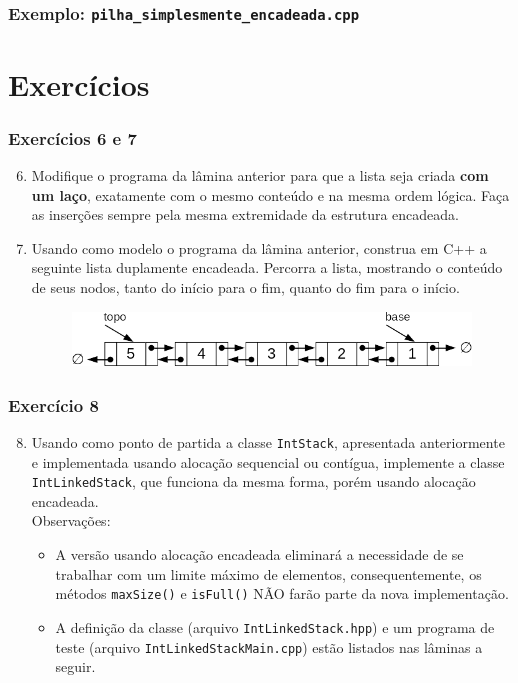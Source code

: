 \documentclass[aspectratio=169]{beamer}
\begin{document}
\begin{frame}[fragile]\frametitle{Exemplo: \texttt{pilha\_simplesmente\_encadeada.cpp}}
\fontsize{5pt}{5pt}\selectfont{

}
\end{frame}

\section{Exercícios}

\begin{frame}[fragile]\frametitle{Exercícios 6 e 7}
\begin{enumerate}
	\setcounter{enumi}{5}
	\item Modifique o programa da lâmina anterior para que a lista seja criada \textbf{com um laço}, exatamente com o mesmo conteúdo e na mesma ordem lógica. Faça as inserções sempre pela mesma extremidade da estrutura encadeada.
	\item Usando como modelo o programa da lâmina anterior, construa em C++ a seguinte lista duplamente encadeada. Percorra a lista, mostrando o conteúdo de seus nodos, tanto do início para o fim, quanto do fim para o início.
\begin{figure}[h]
	\centering
	\includegraphics[height=0.16\paperheight]{imagens/pilha_duplamente_encadeada.png}
\end{figure}
\end{enumerate}
\end{frame}

\begin{frame}[fragile]\frametitle{Exercício 8}
\begin{enumerate}
        \setcounter{enumi}{7}
	\item Usando como ponto de partida a classe \texttt{IntStack}, apresentada anteriormente e implementada usando alocação sequencial ou contígua, implemente a classe \texttt{IntLinkedStack}, que funciona da mesma forma, porém usando alocação encadeada.\\
	Observações:
	\begin{itemize}
		\item A versão usando alocação encadeada eliminará a necessidade de se trabalhar com um limite máximo de elementos, consequentemente, os métodos \texttt{maxSize()} e \texttt{isFull()} NÃO farão parte da nova implementação.
		\item A definição da classe (arquivo \texttt{IntLinkedStack.hpp}) e um programa de teste (arquivo \texttt{IntLinkedStackMain.cpp}) estão listados nas lâminas a seguir.
	\end{itemize}
\end{enumerate}
\end{frame}
\end{document}
